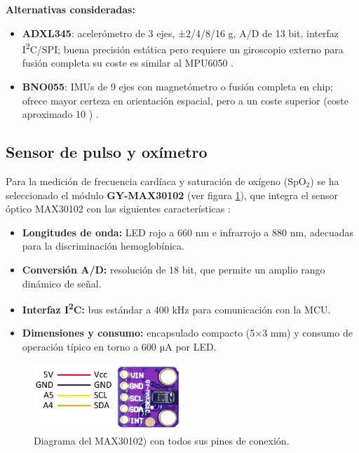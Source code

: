 \documentclass[12pt, a4paper]{article}
\begin{document}
	\noindent\textbf{Alternativas consideradas:}
	\begin{itemize}
		\item \textbf{ADXL345}: acelerómetro de 3 ejes, ±2/4/8/16 g, A/D de 13 bit, interfaz I\textsuperscript{2}C/SPI; buena precisión estática pero requiere un giroscopio externo para fusión completa su coste es similar al MPU6050 \cite{ADXL345Datasheet}.
		\item \textbf{BNO055}: IMUs de 9 ejes con magnetómetro o fusión completa en chip; ofrece mayor certeza en orientación espacial, pero a un coste superior (coste aproximado 10 \texteuro{}) \cite{BNO055Datasheet}.
	\end{itemize}

	\subsection{Sensor de pulso y oxímetro}
	
	Para la medición de frecuencia cardíaca y saturación de oxígeno (SpO$_2$) se ha seleccionado el módulo \textbf{GY-MAX30102} (ver figura \ref{fig:max}), que integra el sensor óptico MAX30102 con las siguientes características \cite{MAX30102Datasheet}:
	\begin{itemize}
		\item \textbf{Longitudes de onda:} LED rojo a 660 nm e infrarrojo a 880 nm, adecuadas para la discriminación hemoglobínica.
		\item \textbf{Conversión A/D:} resolución de 18 bit, que permite un amplio rango dinámico de señal.
		\item \textbf{Interfaz I\textsuperscript{2}C:} bus estándar a 400 kHz para comunicación con la MCU.
		\item \textbf{Dimensiones y consumo:} encapsulado compacto (5×3 mm) y consumo de operación típico en torno a 600 µA por LED.
	\end{itemize}
	
		
	\begin{figure}[htbp]
		\centering
		\includegraphics[width=0.5\textwidth]{images/MAX30102.png}
		\caption[Diagrama de pines del MAX30102]{Diagrama del  \mbox{MAX30102)} con todos sus pines de conexión.}
		\label{fig:max}
	\end{figure}
	
\end{document}
